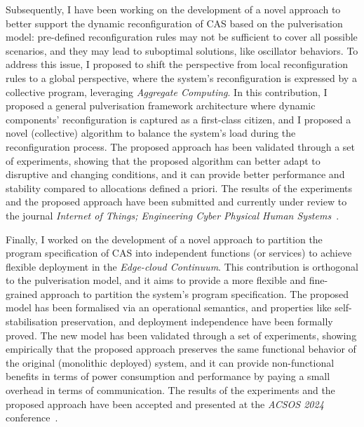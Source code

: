 \documentclass[runningheads]{llncs}
\begin{document}
Subsequently,
I have been working on the development of a novel approach to better support the dynamic reconfiguration of CAS based on the pulverisation model:
pre-defined reconfiguration rules may not be sufficient to cover all possible scenarios,
and they may lead to suboptimal solutions,
like oscillator behaviors.
%
To address this issue,
I proposed to shift the perspective from local reconfiguration rules to a global perspective,
where the system's reconfiguration is expressed by a collective program,
leveraging \emph{Aggregate Computing}.
%
In this contribution,
I proposed a general pulverisation framework architecture where dynamic components' reconfiguration is captured as a first-class citizen,
and I proposed a novel (collective) algorithm to balance the system's load during the reconfiguration process.
%
The proposed approach has been validated through a set of experiments,
showing that the proposed algorithm can better adapt to disruptive and changing conditions,
and it can provide better performance and stability compared to allocations defined a priori.
%
The results of the experiments and the proposed approach have been submitted and currently under review to the journal \emph{Internet of Things; Engineering Cyber Physical Human Systems}~\cite{farabegoli4798700dynamic}.

Finally,
I worked on the development of a novel approach to partition the program specification of CAS into independent functions (or services) to achieve flexible deployment in the \emph{Edge-cloud Continuum}.
%
This contribution is orthogonal to the pulverisation model,
and it aims to provide a more flexible and fine-grained approach to partition the system's program specification.
%
The proposed model has been formalised via an operational semantics,
and properties like self-stabilisation preservation, and deployment independence have been formally proved.
%
The new model has been validated through a set of experiments,
showing empirically that the proposed approach preserves the same functional behavior of the original (monolithic deployed) system,
and it can provide non-functional benefits in terms of power consumption and performance by paying a small overhead in terms of communication.
%
The results of the experiments and the proposed approach have been accepted and presented at the \emph{ACSOS 2024} conference~\cite{DBLP:conf/acsos/FarabegoliFAVE24}.

\end{document}
